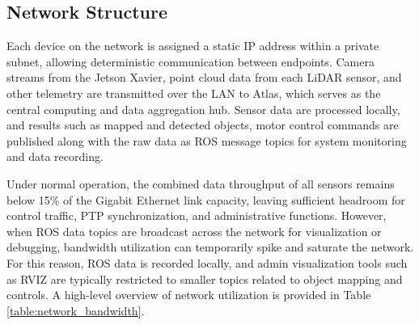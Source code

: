 \documentclass{erauthesis}
\begin{document}




\subsection{Network Structure} \label{comp:network}

Each device on the network is assigned a static IP address within a private subnet, allowing deterministic communication between endpoints.
Camera streams from the Jetson Xavier, point cloud data from each LiDAR sensor, and other telemetry are transmitted over the LAN to Atlas, which serves as the central computing and data aggregation hub.
Sensor data are processed locally, and results such as mapped and detected objects, motor control commands are published along with the raw data as \ac{ROS} message topics for system monitoring and data recording.

Under normal operation, the combined data throughput of all sensors remains below 15\% of the Gigabit Ethernet link capacity, leaving sufficient headroom for control traffic, \ac{PTP} synchronization, and administrative functions.
However, when \ac{ROS} data topics are broadcast across the network for visualization or debugging, bandwidth utilization can temporarily spike and saturate the network.
For this reason, ROS data is recorded locally, and admin visualization tools such as RVIZ are typically restricted to smaller topics related to object mapping and controls.
A high-level overview of network utilization is provided in Table \ref{table:network_bandwidth}.
\end{document}
